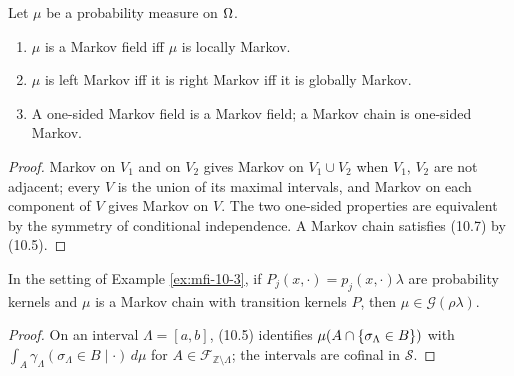 \begin{theorem}[Georgii (10.9)]
    \label{thm:mfi-10-9}
    \leanok

    Let $\mu$ be a probability measure on $\Omega$.
    \begin{enumerate}
    \item $\mu$ is a Markov field iff $\mu$ is locally Markov.
    \item $\mu$ is left Markov iff it is right Markov iff it is globally Markov.
    \item A one-sided Markov field is a Markov field; a Markov chain is one-sided Markov.
    \end{enumerate}
\end{theorem}
\begin{proof}
    \leanok
    Markov on $V_1$ and on $V_2$ gives Markov on $V_1 \cup V_2$ when $V_1$, $V_2$ are not
    adjacent; every $V$ is the union of its maximal intervals, and Markov on each component of
    $V$ gives Markov on $V$. The two one-sided properties are equivalent by the symmetry of
    conditional independence. A Markov chain satisfies (10.7) by (10.5).
\end{proof}

\begin{example}[Georgii (10.11)]
    \label{ex:mfi-10-11}
    \leanok

    In the setting of Example \ref{ex:mfi-10-3}, if $P_j(x, \cdot) = p_j(x, \cdot)\lambda$ are
    probability kernels and $\mu$ is a Markov chain with transition kernels $P$, then
    $\mu \in \mathcal G(\rho\lambda)$.
\end{example}
\begin{proof}
    \leanok
    On an interval $\Lambda = [a,b]$, (10.5) identifies $\mu(A \cap \left\{ \sigma_\Lambda \in B \right\})$
    with $\int_A \gamma_\Lambda(\sigma_\Lambda \in B \mid \cdot)\, d\mu$ for
    $A \in \mathcal F_{\mathbb Z \setminus \Lambda}$; the intervals are cofinal in $\mathcal S$.
\end{proof}

